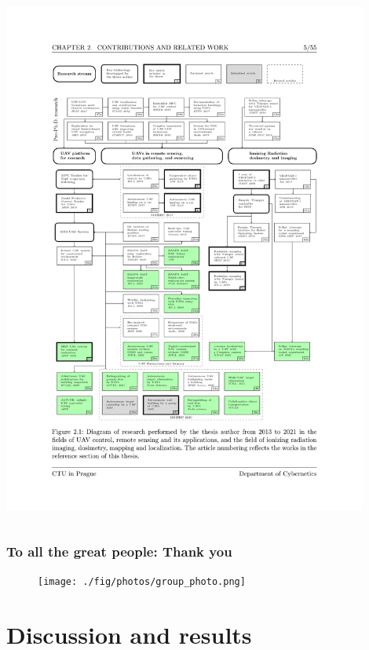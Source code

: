 \documentclass[aspectratio=169]{beamer}
\begin{document}
\begin{frame}
\begin{columns}[c]
\includegraphics[width=0.9\textwidth,trim={2.0cm 5.0cm 2.5cm 5.2cm},clip]{./fig/pubgraph.pdf}

\end{columns}

\end{frame}



\begin{frame}
\frametitle{To all the great people: Thank you}

\begin{figure}
    \texttt{[image: ./fig/photos/group\_photo.png]}
\end{figure}

\end{frame}


\section{Discussion and results}
\end{document}
